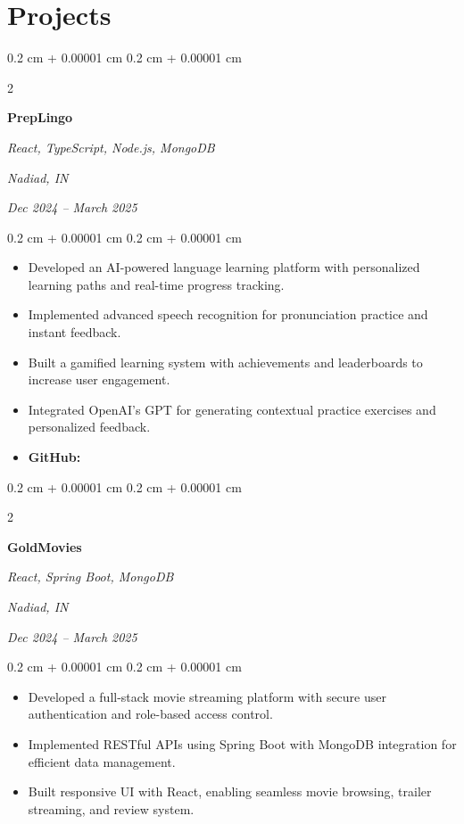 \documentclass[10pt, letterpaper]{article}
\newenvironment{highlights}{
    \begin{itemize}[
        topsep=0.05 cm,
        parsep=0.05 cm,
        partopsep=0pt,
        itemsep=0pt,
        leftmargin=0.4 cm + 10pt
    ]
}{
    \end{itemize}
} %
\newenvironment{onecolentry}{
    \begin{adjustwidth}{
        0.2 cm + 0.00001 cm
    }{
        0.2 cm + 0.00001 cm
    }
}{
    \end{adjustwidth}
} %
\newenvironment{twocolentry}[2][]{
    \onecolentry
    \def\secondColumn{#2}
    \setcolumnwidth{\fill, 4.5 cm}
    \begin{paracol}{2}
}{
    \switchcolumn \raggedleft \secondColumn
    \end{paracol}
    \endonecolentry
} %
\let\hrefWithoutArrow\href
\renewcommand{\href}[2]{\hrefWithoutArrow{#1}{\ifthenelse{\equal{#2}{}}{ }{#2 }\raisebox{.15ex}{\footnotesize \faExternalLink*}}}
\begin{document}
    
    \section{Projects}

        \begin{twocolentry}{
        \textit{Nadiad, IN}    
            
        \textit{Dec 2024 – March 2025}}
            \textbf{PrepLingo}
            
            \textit{React, TypeScript, Node.js, MongoDB}
        \end{twocolentry}
        \vspace{0.10 cm}
        \begin{onecolentry}
            \begin{highlights}
                \item Developed an AI-powered language learning platform with personalized learning paths and real-time progress tracking.
                \item Implemented advanced speech recognition for pronunciation practice and instant feedback.
                \item Built a gamified learning system with achievements and leaderboards to increase user engagement.
                \item Integrated OpenAI's GPT for generating contextual practice exercises and personalized feedback.
                \item \textbf{GitHub:} \href{https://github.com/harshmanek/PrepLingo}{PrepLingo}
            \end{highlights}
        \end{onecolentry}

        \begin{twocolentry}{
        \textit{Nadiad, IN}    
            
        \textit{Dec 2024 – March 2025}}
            \textbf{GoldMovies}
            
            \textit{React, Spring Boot, MongoDB}
        \end{twocolentry}
        \vspace{0.10 cm}
        \begin{onecolentry}
            \begin{highlights}
                \item Developed a full-stack movie streaming platform with secure user authentication and role-based access control.
                \item Implemented RESTful APIs using Spring Boot with MongoDB integration for efficient data management.
                \item Built responsive UI with React, enabling seamless movie browsing, trailer streaming, and review system.
            \end{highlights}
        \end{onecolentry}
\end{document}
